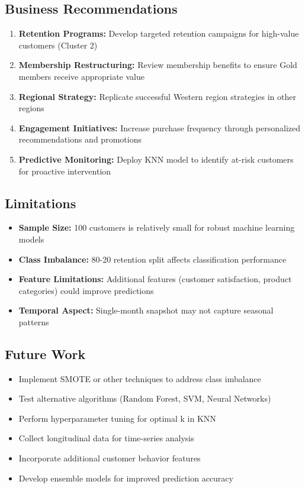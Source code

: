\documentclass[12pt,a4paper]{article}
\begin{document}
\subsection{Business Recommendations}
\begin{enumerate}
    \item \textbf{Retention Programs:} Develop targeted retention campaigns for high-value customers (Cluster 2)
    \item \textbf{Membership Restructuring:} Review membership benefits to ensure Gold members receive appropriate value
    \item \textbf{Regional Strategy:} Replicate successful Western region strategies in other regions
    \item \textbf{Engagement Initiatives:} Increase purchase frequency through personalized recommendations and promotions
    \item \textbf{Predictive Monitoring:} Deploy KNN model to identify at-risk customers for proactive intervention
\end{enumerate}

\subsection{Limitations}
\begin{itemize}
    \item \textbf{Sample Size:} 100 customers is relatively small for robust machine learning models
    \item \textbf{Class Imbalance:} 80-20 retention split affects classification performance
    \item \textbf{Feature Limitations:} Additional features (customer satisfaction, product categories) could improve predictions
    \item \textbf{Temporal Aspect:} Single-month snapshot may not capture seasonal patterns
\end{itemize}

\subsection{Future Work}
\begin{itemize}
    \item Implement SMOTE or other techniques to address class imbalance
    \item Test alternative algorithms (Random Forest, SVM, Neural Networks)
    \item Perform hyperparameter tuning for optimal k in KNN
    \item Collect longitudinal data for time-series analysis
    \item Incorporate additional customer behavior features
    \item Develop ensemble models for improved prediction accuracy
\end{itemize}
\end{document}
